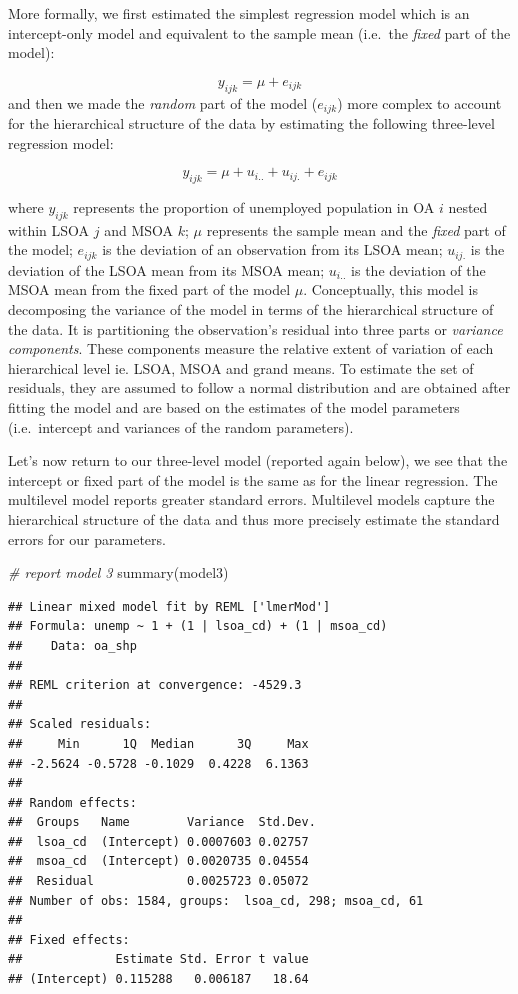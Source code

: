 \documentclass[
]{book}
\newenvironment{Shaded}{\begin{snugshade}}{\end{snugshade}}
\newcommand{\CommentTok}[1]{\textcolor[rgb]{0.56,0.35,0.01}{\textit{#1}}}
\newcommand{\FunctionTok}[1]{\textcolor[rgb]{0.00,0.00,0.00}{#1}}
\newcommand{\NormalTok}[1]{#1}
\begin{document}
More formally, we first estimated the simplest regression model which is an intercept-only model and equivalent to the sample mean (i.e.~the \emph{fixed} part of the model):

\[y_{ijk} = \mu + e_{ijk}\]
and then we made the \emph{random} part of the model (\(e_{ijk}\)) more complex to account for the hierarchical structure of the data by estimating the following three-level regression model:

\[y_{ijk} = \mu + u_{i..} + u_{ij.} + e_{ijk}\]

where \(y_{ijk}\) represents the proportion of unemployed population in OA \(i\) nested within LSOA \(j\) and MSOA \(k\); \(\mu\) represents the sample mean and the \emph{fixed} part of the model; \(e_{ijk}\) is the deviation of an observation from its LSOA mean; \(u_{ij.}\) is the deviation of the LSOA mean from its MSOA mean; \(u_{i..}\) is the deviation of the MSOA mean from the fixed part of the model \(\mu\). Conceptually, this model is decomposing the variance of the model in terms of the hierarchical structure of the data. It is partitioning the observation's residual into three parts or \emph{variance components}. These components measure the relative extent of variation of each hierarchical level ie. LSOA, MSOA and grand means. To estimate the set of residuals, they are assumed to follow a normal distribution and are obtained after fitting the model and are based on the estimates of the model parameters (i.e.~intercept and variances of the random parameters).

Let's now return to our three-level model (reported again below), we see that the intercept or fixed part of the model is the same as for the linear regression. The multilevel model reports greater standard errors. Multilevel models capture the hierarchical structure of the data and thus more precisely estimate the standard errors for our parameters.

\begin{Shaded}
\begin{Highlighting}[]
\CommentTok{\# report model 3}
\FunctionTok{summary}\NormalTok{(model3)}
\end{Highlighting}
\end{Shaded}

\begin{verbatim}
## Linear mixed model fit by REML ['lmerMod']
## Formula: unemp ~ 1 + (1 | lsoa_cd) + (1 | msoa_cd)
##    Data: oa_shp
## 
## REML criterion at convergence: -4529.3
## 
## Scaled residuals: 
##     Min      1Q  Median      3Q     Max 
## -2.5624 -0.5728 -0.1029  0.4228  6.1363 
## 
## Random effects:
##  Groups   Name        Variance  Std.Dev.
##  lsoa_cd  (Intercept) 0.0007603 0.02757 
##  msoa_cd  (Intercept) 0.0020735 0.04554 
##  Residual             0.0025723 0.05072 
## Number of obs: 1584, groups:  lsoa_cd, 298; msoa_cd, 61
## 
## Fixed effects:
##             Estimate Std. Error t value
## (Intercept) 0.115288   0.006187   18.64
\end{verbatim}
\end{document}
